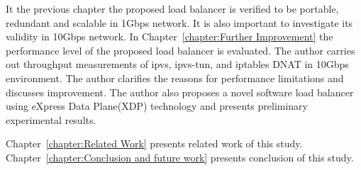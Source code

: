 It the previous chapter the proposed load balancer is verified to be portable, redundant and scalable in 1Gbps network.
It is also important to investigate its validity in 10Gbps network.
In Chapter~\ref{chapter:Further Improvement} the performance level of the proposed load balancer is evaluated.
The author carries out throughput measurements of ipvs, ipvs-tun, and iptables DNAT in 10Gbps environment.
The author clarifies the reasons for performance limitations and discusses improvement.
The author also proposes a novel software load balancer using eXpress Data Plane(XDP) technology and presents preliminary experimental results.

Chapter~\ref{chapter:Related Work} presents related work of this study.
%
Chapter~\ref{chapter:Conclusion and future work} presents conclusion of this study.




